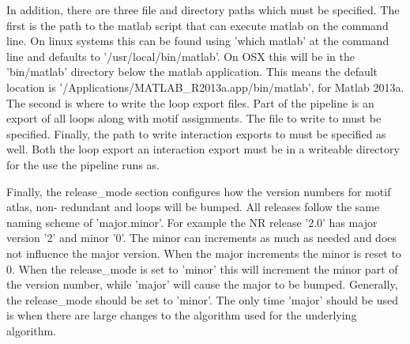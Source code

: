 In addition, there are three file and directory paths which must be specified.
The first is the path to the matlab script that can execute matlab on the
command line. On linux systems this can be found using 'which matlab' at the
command line and defaults to '/usr/local/bin/matlab'. On OSX this will be in the
'bin/matlab' directory below the matlab application. This means the default
location is '/Applications/MATLAB\_R2013a.app/bin/matlab', for Matlab 2013a. The
second is where to write the loop export files. Part of the pipeline is an
export of all loops along with motif assignments. The file to write to must be
specified. Finally, the path to write interaction exports to must be specified
as well. Both the loop export an interaction export must be in a writeable
directory for the use the pipeline runs as.

Finally, the release\_mode section configures how the version numbers for motif
atlas, non- redundant and loops will be bumped. All releases follow the same
naming scheme of 'major.minor'. For example the NR release '2.0' has major
version '2' and minor '0'. The minor can increments as much as needed and does
not influence the major version. When the major increments the minor is reset to
0. When the release\_mode is set to 'minor' this will increment the minor part
of the version number, while 'major' will cause the major to be bumped.
Generally, the release\_mode should be set to 'minor'. The only time 'major'
should be used is when there are large changes to the algorithm used for the
underlying algorithm.

